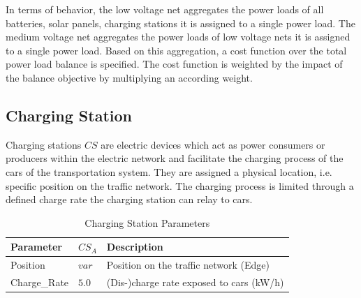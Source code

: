 



In terms of behavior, the low voltage net aggregates the power loads of all batteries, solar panels, charging stations it is assigned to a single power load. The medium voltage net aggregates the power loads of low voltage nets it is assigned to a single power load. Based on this aggregation, a cost function over the total power load balance is specified. The cost function is weighted by the impact of the balance objective by multiplying an according weight.

\subsection{Charging Station}
Charging stations $CS$ are electric devices which act as power consumers or producers within the electric network and facilitate the charging process of the cars of the transportation system. They are assigned a physical location, i.e. specific position on the traffic network. The charging process is limited through a defined charge rate the charging station can relay to cars.

\begin{table}[h]
	\renewcommand{\arraystretch}{1.3}
	\caption{Charging Station Parameters}
	\centering
	\begin{tabular}{lll}
		\hline
		\textbf{Parameter}      & \textbf{$CS_{A}$} & \textbf{Description} \\ \hline
		Position      			& $var$ & Position on the traffic network (Edge) \\  
		Charge\_Rate        	& $5.0$ & (Dis-)charge rate exposed to cars (kW/h)     \\ \hline
	\end{tabular}
\end{table}


